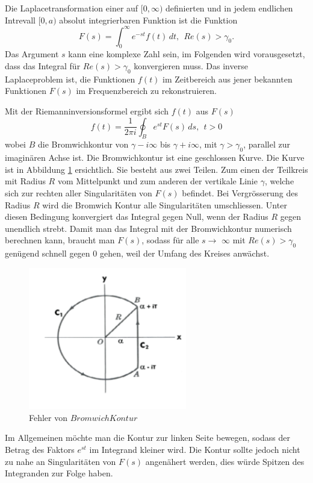 %
%
%
Die Laplacetransformation einer auf $[0, \infty)$ definierten und in jedem endlichen Intrevall  $[0, a)$ absolut integrierbaren Funktion ist die Funktion
\[
F(s) = \int_0^\infty e^{-st}f(t)\,dt,~~Re(s)>\gamma_{0}.
\]
Das Argument $s$ kann eine komplexe Zahl sein, im Folgenden wird vorausgesetzt, dass das Integral für $Re(s)>\gamma_{0}$ konvergieren muss.
Das inverse Laplaceproblem ist, die Funktionen $f(t)$ im Zeitbereich aus jener bekannten Funktionen $F(s)$ im Frequenzbereich zu rekonstruieren.

Mit der Riemanninversionsformel ergibt sich $f(t)$ aus $F(s)$
\[
f(t) = \frac{1}{2\pi i} \oint_{B} e^{st}F(s)\,ds,~~t>0
\]
wobei $B$ die Bromwichkontur von $\gamma-i\infty$ bis $\gamma+i\infty$, mit $\gamma>\gamma_{0}$, parallel zur imaginären Achse ist. Die Bromwichkontur ist eine geschlossen Kurve. Die Kurve ist in Abbildung \ref{laplace:bromwichkontur} ersichtlich. Sie besteht aus zwei Teilen. Zum einen der Teilkreis mit Radius $R$ vom Mittelpunkt und zum anderen der vertikale Linie $\gamma$, welche sich zur rechten aller Singularitäten von $F(s)$ befindet.  Bei Vergrösserung des Radius $R$ wird die Bromwich Kontur alle Singularitäten umschliessen. Unter diesen Bedingung konvergiert das Integral gegen Null, wenn der Radius $R$ gegen unendlich strebt.
Damit man das Integral mit der Bromwichkontur numerisch berechnen kann, braucht man $F(s)$, sodass für alle $s\rightarrow$ $\infty$ mit $Re(s)> \gamma_{0}$ genügend schnell gegen 0 gehen, weil der Umfang des Kreises anwächst.


\begin{figure}
\centering
\includegraphics[width=6.9cm]{papers/laplace/Bromwich_Contour}
\caption{Fehler von $Bromwich Kontur$
\label{laplace:bromwichkontur}
}
\end{figure}

Im Allgemeinen möchte man die Kontur zur linken Seite bewegen, sodass der Betrag des Faktors $e^{st}$ im Integrand kleiner wird.
Die Kontur sollte jedoch nicht zu nahe an Singularitäten von $F(s)$ angenähert werden, dies würde Spitzen des Integranden zur Folge haben.

